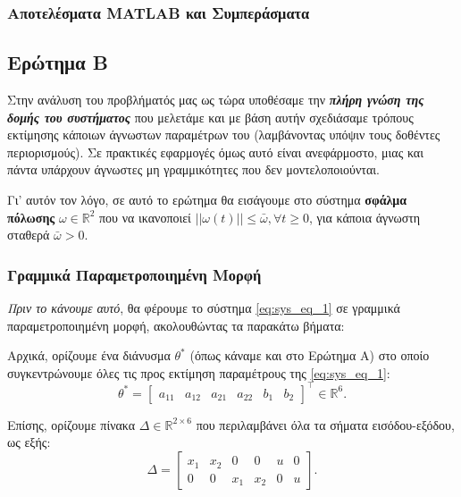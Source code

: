 \documentclass[12pt]{article} %
\numberwithin{equation}{section}  %
\begin{document}
\newpage

\subsubsection{Αποτελέσματα MATLAB και Συμπεράσματα}




\newpage

\subsection{Ερώτημα Β}

Στην ανάλυση του προβλήματός μας ως τώρα υποθέσαμε την \textit{\textbf{πλήρη γνώση της δομής του συστήματος}} που μελετάμε 
και με βάση αυτήν σχεδιάσαμε τρόπους εκτίμησης κάποιων άγνωστων παραμέτρων του (λαμβάνοντας υπόψιν τους δοθέντες περιορισμούς). 
Σε πρακτικές εφαρμογές όμως αυτό είναι ανεφάρμοστο, μιας και πάντα υπάρχουν άγνωστες μη γραμμικότητες που δεν μοντελοποιούνται. 

Γι' αυτόν τον λόγο, σε αυτό το ερώτημα θα εισάγουμε στο σύστημα \textbf{σφάλμα πόλωσης} $\omega \in \mathbb{R}^2$ 
που να ικανοποιεί $||\omega(t)|| \le \bar{\omega}, \forall t \ge 0$, για κάποια άγνωστη σταθερά $\bar{\omega} > 0$.

\subsubsection{Γραμμικά Παραμετροποιημένη Μορφή}

\textit{Πριν το κάνουμε αυτό}, θα φέρουμε το σύστημα \eqref{eq:sys_eq_1} σε γραμμικά παραμετροποιημένη μορφή, ακολουθώντας τα παρακάτω βήματα:

\noindent\textbullet\hspace{0.2em} Αρχικά, ορίζουμε ένα διάνυσμα $\theta^*$ (όπως κάναμε και στο Ερώτημα Α) στο οποίο συγκεντρώνουμε όλες τις προς εκτίμηση παραμέτρους της \eqref{eq:sys_eq_1}:
\vspace{-\topsep}
\vspace{+2pt}
\begin{equation}
   \theta^* = \begin{bmatrix} a_{11} & a_{12} & a_{21} & a_{22} & b_{1} & b_{2} \end{bmatrix}^\top \in \mathbb{R}^6. 
\end{equation}

\noindent Επίσης, ορίζουμε πίνακα $\Delta \in \mathbb{R}^{2 \times 6}$ που περιλαμβάνει όλα τα σήματα εισόδου-εξόδου, ως εξής:
\begin{equation}
\Delta = \begin{bmatrix}
    x_1 & x_2 & 0   & 0   & u & 0 \\
    0   & 0   & x_1 & x_2 & 0 & u
\end{bmatrix}.
\end{equation}
\end{document}
